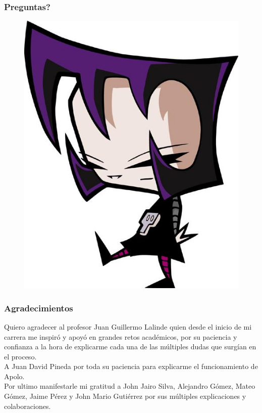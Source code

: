 \begin{frame}
\frametitle{Preguntas?}
      \begin{figure}[ht]
        \centering
        \includegraphics[scale=0.4]{imgs/gaz}
      \end{figure}
\end{frame}

\begin{frame}
\frametitle{Agradecimientos}

  \small 
  Quiero agradecer al profesor Juan Guillermo Lalinde quien desde el inicio de mi carrera me inspiró y apoyó en grandes retos académicos, por su paciencia y confianza a la hora de explicarme cada una de las múltiples dudas que surgían en el proceso.\\

  A Juan David Pineda por toda su paciencia para explicarme el funcionamiento de Apolo.\\

  Por ultimo manifestarle mi gratitud a John Jairo Silva, Alejandro Gómez, Mateo Gómez, Jaime Pérez y John Mario Gutiérrez por sus múltiples explicaciones y colaboraciones.

\end{frame}



